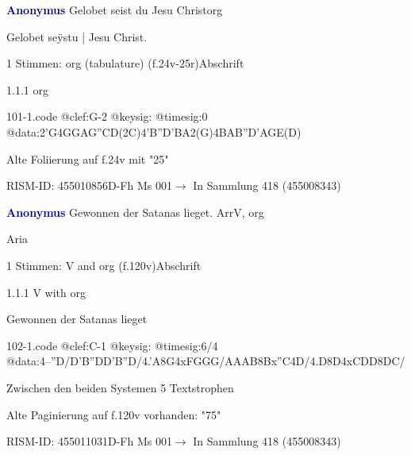\documentclass[twocolumn]{book}
\begin{document}
\par \vspace{7pt} \textcolor{darkblue}{\textbf{Anonymus  }}\hfillplus{\textbf{[101]}}\newline Gelobet seist du Jesu Christ\newline org
\par \begin{itshape}[f.24v, at left:] Gelobet seÿstu | Jesu Christ.\end{itshape} 
\par \textcolor{darkblue}{}  1 Stimmen: org (tabulature)  (f.24v-25r)\newline Abschrift
\par 1.1.1  org  
\begin{filecontents*}{101-1.code}
@clef:G-2
@keysig:
@timesig:0
@data:2'G4GGAG''CD(2C)4'B''D'BA2(G)4BAB''D'AGE(D)
\end{filecontents*}
\newline
%
\par Alte Foliierung auf f.24v mit "25"
\par RISM-ID: 455010856\newline D-Fh  Ms 001\newline $\rightarrow$ In Sammlung 418 (455008343)
      
\par \vspace{7pt} \textcolor{darkblue}{\textbf{Anonymus  }}\hfillplus{\textbf{[102]}}\newline Gewonnen der Satanas lieget. Arr\newline V, org
\par \begin{itshape}[f.120v, heading:] Aria\end{itshape} 
\par \textcolor{darkblue}{}  1 Stimmen: V and org  (f.120v)\newline Abschrift
\par 1.1.1  V with org\newline \begin{footnotesize} Gewonnen der Satanas lieget \end{footnotesize}  
\begin{filecontents*}{102-1.code}
@clef:C-1
@keysig:
@timesig:6/4
@data:4--''D/D'B''DD'B''D/4.'A8G4xFGGG/AAAB{8Bx''C}4D/4.D8D4xCDD{8DC}/
\end{filecontents*}
\newline
%
\par Zwischen den beiden Systemen 5 Textstrophen
\par Alte Paginierung auf f.120v vorhanden: "75"
\par RISM-ID: 455011031\newline D-Fh  Ms 001\newline $\rightarrow$ In Sammlung 418 (455008343)
      
\end{document}
